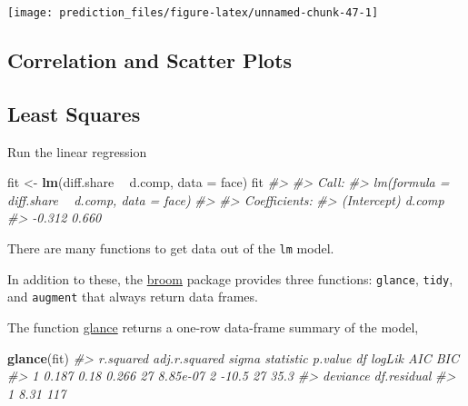 \documentclass[]{book}
\newenvironment{Shaded}{\begin{snugshade}}{\end{snugshade}}
\newcommand{\CommentTok}[1]{\textcolor[rgb]{0.56,0.35,0.01}{\textit{#1}}}
\newcommand{\DataTypeTok}[1]{\textcolor[rgb]{0.13,0.29,0.53}{#1}}
\newcommand{\KeywordTok}[1]{\textcolor[rgb]{0.13,0.29,0.53}{\textbf{#1}}}
\newcommand{\NormalTok}[1]{#1}
\newcommand{\OperatorTok}[1]{\textcolor[rgb]{0.81,0.36,0.00}{\textbf{#1}}}
\newcommand{\StringTok}[1]{\textcolor[rgb]{0.31,0.60,0.02}{#1}}
\theoremstyle{definition}
\theoremstyle{definition}
\theoremstyle{definition}
\theoremstyle{remark}
\begin{document}
\begin{center}\texttt{[image: prediction\_files/figure-latex/unnamed-chunk-47-1]} \end{center}

\hypertarget{correlation-and-scatter-plots}{%
\subsection{Correlation and Scatter
Plots}\label{correlation-and-scatter-plots}}

\begin{Shaded}
\end{Shaded}

\hypertarget{least-squares}{%
\subsection{Least Squares}\label{least-squares}}

Run the linear regression

\begin{Shaded}
\begin{Highlighting}[]
\NormalTok{fit <-}\StringTok{ }\KeywordTok{lm}\NormalTok{(diff.share }\OperatorTok{~}\StringTok{ }\NormalTok{d.comp, }\DataTypeTok{data =}\NormalTok{ face)}
\NormalTok{fit}
\CommentTok{#> }
\CommentTok{#> Call:}
\CommentTok{#> lm(formula = diff.share ~ d.comp, data = face)}
\CommentTok{#> }
\CommentTok{#> Coefficients:}
\CommentTok{#> (Intercept)       d.comp  }
\CommentTok{#>      -0.312        0.660}
\end{Highlighting}
\end{Shaded}

There are many functions to get data out of the \texttt{lm} model.

In addition to these, the
\href{https://cran.r-project.org/package=broom}{broom} package provides
three functions: \texttt{glance}, \texttt{tidy}, and \texttt{augment}
that always return data frames.

The function
\href{https://www.rdocumentation.org/packages/broom/topics/glance.lm}{glance}
returns a one-row data-frame summary of the model,

\begin{Shaded}
\begin{Highlighting}[]
\KeywordTok{glance}\NormalTok{(fit)}
\CommentTok{#>   r.squared adj.r.squared sigma statistic  p.value df logLik AIC  BIC}
\CommentTok{#> 1     0.187          0.18 0.266        27 8.85e-07  2  -10.5  27 35.3}
\CommentTok{#>   deviance df.residual}
\CommentTok{#> 1     8.31         117}
\end{Highlighting}
\end{Shaded}
\end{document}
